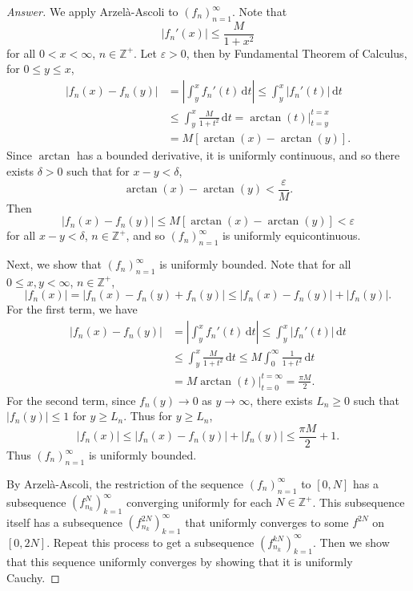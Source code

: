 \documentclass[12pt]{article}
\newcommand{\z}{\mathbb{Z}}
\newcommand\paren[1]{\left( #1 \right)}
\newcommand{\sqbrack}[1]{\left [ #1 \right ]}
\newcommand{\abs}[1]{\left | #1 \right |}
\newcommand{\eps}{\varepsilon}
\renewcommand{\i}[4]{\int_{#1}^{#2} {#3} \, \mathrm{d} {#4} }
\theoremstyle{definition}
\begin{document}
\begin{proof}[Answer]
    We apply Arzel\`a-Ascoli to $\paren{ f_{n} }_{n=1}^{\infty}$. Note that
    \[
        \abs{ f_n'(x) } \leq \frac{M}{1 + x^2}
    \]
    for all $0 < x < \infty$, $n \in \z^+$. Let $\eps > 0$, then by Fundamental Theorem of Calculus, for $0 \leq y \leq x$, 
    \begin{align*}
        \abs{ f_n(x) - f_n(y) } & = \abs{ \i{y}{x}{f_n'(t)}{t} } \leq \i{y}{x}{ \abs{ f_n'(t) } }{t} \\ 
        & \leq \i{y}{x}{ \frac{M}{1 + t^2} }{t} = \left. \arctan(t) \right|_{t = y}^{t = x} \\ 
        & = M \sqbrack{ \arctan(x) - \arctan(y) } . 
    \end{align*}
    Since $\arctan$ has a bounded derivative, it is uniformly continuous, and so there exists $\delta > 0$ such that for $x - y < \delta$, 
    \[
        \arctan(x) - \arctan(y) < \frac{\eps}{M} . 
    \]
    Then 
    \[
        \abs{ f_n(x) - f_n(y) } \leq M \sqbrack{ \arctan(x) - \arctan(y) } < \eps 
    \]
    for all $x - y < \delta$, $n \in \z^+$, and so $\paren{ f_n }_{n = 1}^{\infty}$ is uniformly equicontinuous. 
    
    Next, we show that $\paren{ f_n }_{n = 1}^{\infty}$ is uniformly bounded. Note that for all $0 \leq x , y < \infty$, $n \in \z^+$, 
    \[
        \abs{ f_n(x) } = \abs{ f_n(x) - f_n(y) + f_n(y) } \leq \abs{ f_n(x) - f_n(y) } + \abs{ f_n(y) } . 
    \]
    For the first term, we have 
    \begin{align*}
        \abs{ f_n(x) - f_n(y) } & = \abs{ \i{y}{x}{ f_n'(t) }{t} } \leq \i{y}{x}{ \abs{ f_n'(t) } }{t} \\ 
        & \leq \i{y}{x}{ \frac{M}{1 + t^2} }{t} \leq M \i{0}{\infty}{ \frac{1}{1 + t^2} }{t} \\ 
        & = \left. M \arctan(t) \right|_{t = 0}^{t = \infty} = \frac{\pi M}{2} . 
    \end{align*}
    For the second term, since $f_n(y) \to 0$ as $y \to \infty$, there exists $L_n \geq 0$ such that $\abs{ f_n(y) } \leq 1$ for $y \geq L_n$. Thus for $y \geq L_n$, 
    \[
        \abs{ f_n(x) } \leq \abs{ f_n(x) - f_n(y) } + \abs{ f_n(y) } \leq \frac{\pi M}{2} + 1 . 
    \]
    Thus $\paren{ f_n }_{n = 1}^{\infty}$ is uniformly bounded.
    
    By  Arzel\`a-Ascoli, the restriction of the sequence $\paren{ f_{n} }_{n=1}^{\infty}$ to $[0,N]$ has a subsequence $\paren{ f^N_{n_k} }_{k=1}^{\infty}$ converging uniformly for each $N \in \z^+$. This subsequence itself has a subsequence $\paren{ f_{n_k}^{2N} }_{k = 1}^{\infty}$ that uniformly converges to some $f^{2N}$ on $[0,2N]$. Repeat this process to get a subsequence $\paren{ f_{n_k}^{kN} }_{k = 1}^{\infty}$. Then we show that this sequence uniformly converges by showing that it is uniformly Cauchy. 
    

\end{proof}
\end{document}
